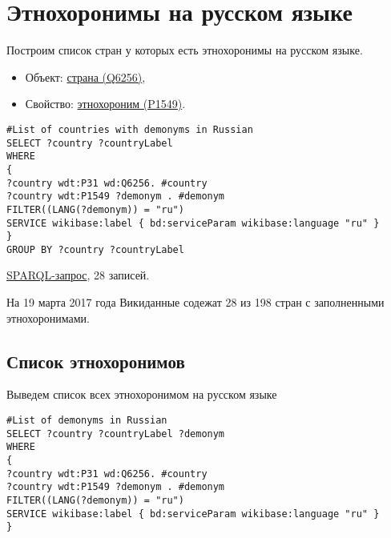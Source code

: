 \section{Этнохоронимы на русском языке}

Построим список стран у которых есть этнохоронимы на русском языке.

\begin{itemize}
\item Объект: \href{https://www.wikidata.org/wiki/Q6256}{страна (Q6256)},
\item Свойство: \href{https://www.wikidata.org/wiki/Property:P1549}{этнохороним (P1549)}.
\end{itemize}

\begin{lstlisting}[language=SPARQL]
#List of countries with demonyms in Russian
SELECT ?country ?countryLabel 
WHERE
{
?country wdt:P31 wd:Q6256. #country
?country wdt:P1549 ?demonym . #demonym
FILTER((LANG(?demonym)) = "ru")
SERVICE wikibase:label { bd:serviceParam wikibase:language "ru" }
}
GROUP BY ?country ?countryLabel
\end{lstlisting}

\href{https://query.wikidata.org/#%23List%20of%20countries%20with%20demonyms%20in%20Russian%0ASELECT%20%3Fcountry%20%3FcountryLabel%20%0AWHERE%0A%7B%0A%09%3Fcountry%20wdt%3AP31%20wd%3AQ6256.%20%20%20%20%20%20%20%23country%0A%09%3Fcountry%20wdt%3AP1549%20%3Fdemonym%20.%20%20%20%20%23demonym%0A%09FILTER%28%28LANG%28%3Fdemonym%29%29%20%3D%20%22ru%22%29%0A%09SERVICE%20wikibase%3Alabel%20%7B%20bd%3AserviceParam%20wikibase%3Alanguage%20%22ru%22%20%7D%0A%7D%0A%0AGROUP%20BY%20%3Fcountry%20%3FcountryLabel}{SPARQL-запрос}, 28 записей.

На 19 марта 2017 года Викиданные содежат 28 из 198 стран с заполненными этнохоронимами.

\subsection{Список этнохоронимов}

Выведем список всех этнохоронимом на русском языке
\begin{lstlisting}[language=SPARQL]
#List of demonyms in Russian
SELECT ?country ?countryLabel ?demonym
WHERE
{
?country wdt:P31 wd:Q6256. #country
?country wdt:P1549 ?demonym . #demonym
FILTER((LANG(?demonym)) = "ru")
SERVICE wikibase:label { bd:serviceParam wikibase:language "ru" }
}
\end{lstlisting}

